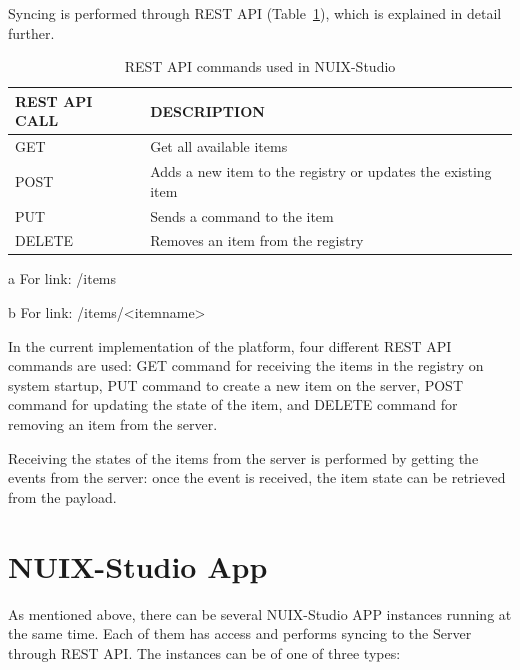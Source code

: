 Syncing is performed through REST API (Table~\ref{tab:rest-api-table}), which is explained in detail further.

\begin{table}
  \centering
  \begin{threeparttable}[c]
    \caption{REST API commands used in NUIX-Studio}
    \label{tab:rest-api-table}
    \begin{tabular}{ll}
      \toprule
      REST API CALL    &         DESCRIPTION                 \\
      \midrule
      GET\tnote{a} & Get all available items \\
      POST\tnote{b} & Adds a new item to the registry or updates the existing item    \\
      PUT\tnote{b}        & Sends a command to the item                              \\
      DELETE\tnote{b}        & Removes an item from the registry          \\
      \bottomrule
    \end{tabular}
    \begin{tablenotes}
      \item [a] For link: /items
      \item [b] For link: /items/<itemname>
    \end{tablenotes}
  \end{threeparttable}
\end{table}

In the current implementation of the platform, four different REST API commands are used: GET command for receiving the items in the registry on system startup, PUT command to create a new item on the server, POST command for updating the state of the item, and DELETE command for removing an item from the server.

Receiving the states of the items from the server is performed by getting the events from the server: once the event is received, the item state can be retrieved from the payload.

\section{NUIX-Studio App}

As mentioned above, there can be several NUIX-Studio APP instances running at the same time. Each of them has access and performs syncing to the Server through REST API. The instances can be of one of three types:

